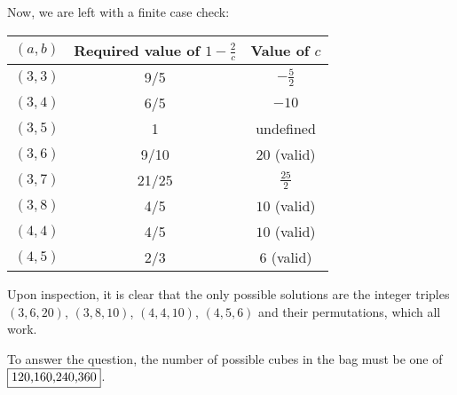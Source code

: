 \documentclass[10pt]{../usamts}
\begin{document}
\begin{solution}
Now, we are left with a finite case check:

\begin{center}
\begin{tabular}{c | c | c}
    $(a,b)$ & Required value of $1-\frac{2}{c}$ & Value of $c$\\\hline
    $(3,3)$ & 9/5 & $-\frac{5}{2}$ \\
    $(3,4)$ & 6/5 & $-10$ \\
    $(3,5)$ & 1 & undefined \\
    $(3,6)$ & 9/10 & $20$ (valid) \\
    $(3,7)$ & 21/25 & $\frac{25}{2}$ \\
    $(3,8)$ & 4/5 & $10$ (valid) \\
    $(4,4)$ & 4/5 & $10$ (valid) \\
    $(4,5)$ & 2/3 & $6$ (valid) \\
\end{tabular}
\end{center}

Upon inspection, it is clear that the only possible solutions are the integer triples $(3,6,20)$, $(3,8,10)$, $(4,4,10)$, $(4,5,6)$ and their permutations, which all work.

To answer the question, the number of possible cubes in the bag must be one of $\fbox{120,160,240,360}$.

\end{solution}
\end{document}
